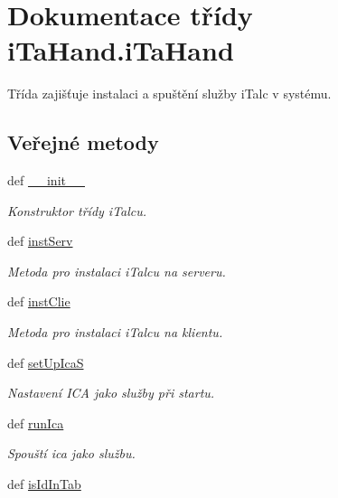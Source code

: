 \hypertarget{classiTaHand_1_1iTaHand}{\section{Dokumentace třídy i\-Ta\-Hand.\-i\-Ta\-Hand}
\label{dc/de8/classiTaHand_1_1iTaHand}
}


Třída zajišťuje instalaci a spuštění služby i\-Talc v systému.  


\subsection*{Veřejné metody}
\begin{DoxyCompactItemize}
\item 
def \hyperlink{classiTaHand_1_1iTaHand_a64503f2a5c4a567b0db2e45a0438843d}{\-\_\-\-\_\-init\-\_\-\-\_\-}
\begin{DoxyCompactList}\small\item\em Konstruktor třídy i\-Talcu. \end{DoxyCompactList}\item 
def \hyperlink{classiTaHand_1_1iTaHand_a443c02d5f0e6dba13ed12d04e53a3417}{inst\-Serv}
\begin{DoxyCompactList}\small\item\em Metoda pro instalaci i\-Talcu na serveru. \end{DoxyCompactList}\item 
def \hyperlink{classiTaHand_1_1iTaHand_aba573d17165dd8ae89e4cb7f2594edfa}{inst\-Clie}
\begin{DoxyCompactList}\small\item\em Metoda pro instalaci i\-Talcu na klientu. \end{DoxyCompactList}\item 
def \hyperlink{classiTaHand_1_1iTaHand_a736b7cb10e6b62e40b76b86853aa56da}{set\-Up\-Ica\-S}
\begin{DoxyCompactList}\small\item\em Nastavení I\-C\-A jako služby při startu. \end{DoxyCompactList}\item 
def \hyperlink{classiTaHand_1_1iTaHand_ad80b70dfbf9108f959206e7bc3d70cc6}{run\-Ica}
\begin{DoxyCompactList}\small\item\em Spouští ica jako službu. \end{DoxyCompactList}\item 
def \hyperlink{classiTaHand_1_1iTaHand_a8d31639e4960373d8bb382b3a4a92146}{is\-Id\-In\-Tab}

\end{DoxyCompactItemize}
